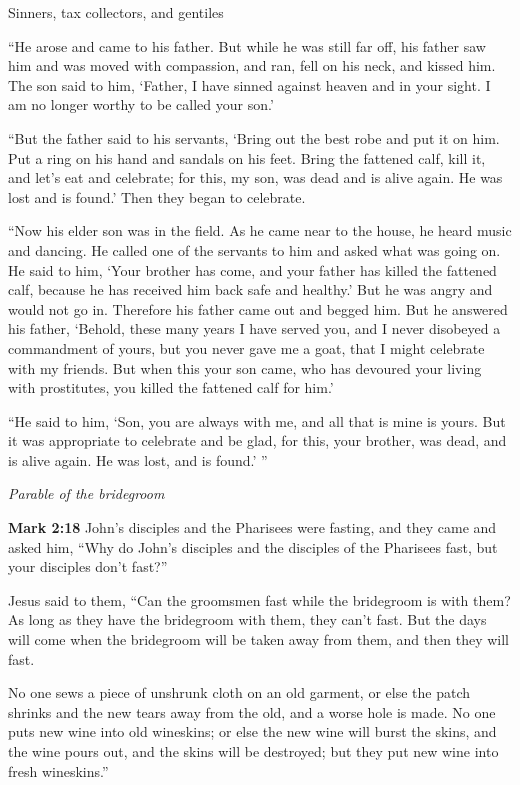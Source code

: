 \documentclass[10pt,twoside]{article} %
\newcommand{\quotesize}{\normalsize{}}
\newenvironment{quotetext}{\begingroup\quotesize}{\endgroup}
\newcommand{\bible}[2]{\begin{quotetext}\textbf{#1} #2\end{quotetext}}
\newcommand{\gospelmark}[2]{\bible{Mark #1}{#2}}
\newcommand{\subhead}[1]{\emph{#1}\par}
\begin{document}
\begin{section}{Sinners, tax collectors, and gentiles}
{   ``He arose and came to his father. But while he was still far off, his father saw him and was moved with compassion, and ran, fell on his neck, and kissed him.    The son said to him, `Father, I have sinned against heaven and in your sight. I am no longer worthy to be called your son.'

   ``But the father said to his servants, `Bring out the best robe and put it on him. Put a ring on his hand and sandals on his feet.    Bring the fattened calf, kill it, and let's eat and celebrate;    for this, my son, was dead and is alive again. He was lost and is found.' Then they began to celebrate.

   ``Now his elder son was in the field. As he came near to the house, he heard music and dancing.    He called one of the servants to him and asked what was going on.    He said to him, `Your brother has come, and your father has killed the fattened calf, because he has received him back safe and healthy.'    But he was angry and would not go in. Therefore his father came out and begged him.    But he answered his father, `Behold, these many years I have served you, and I never disobeyed a commandment of yours, but you never gave me a goat, that I might celebrate with my friends.    But when this your son came, who has devoured your living with prostitutes, you killed the fattened calf for him.'

   ``He said to him, `Son, you are always with me, and all that is mine is yours.    But it was appropriate to celebrate and be glad, for this, your brother, was dead, and is alive again. He was lost, and is found.' '' 
}

\subhead{Parable of the bridegroom}

\gospelmark{2:18}{John's disciples and the Pharisees were fasting, and they came and asked him, ``Why do John's disciples and the disciples of the Pharisees fast, but your disciples don't fast?''

  Jesus said to them, ``Can the groomsmen fast while the bridegroom is with them? As long as they have the bridegroom with them, they can't fast.    But the days will come when the bridegroom will be taken away from them, and then they will fast.

    No one sews a piece of unshrunk cloth on an old garment, or else the patch shrinks and the new tears away from the old, and a worse hole is made.    No one puts new wine into old wineskins; or else the new wine will burst the skins, and the wine pours out, and the skins will be destroyed; but they put new wine into fresh wineskins.'' }


\end{section}
\end{document}

